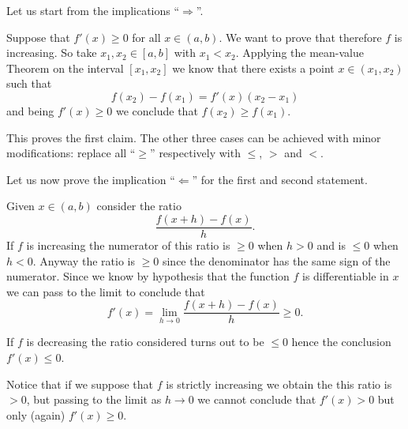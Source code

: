 \documentclass[12pt]{article}
\begin{document}
Let us start from the implications ``$\Rightarrow$''.

Suppose that $f'(x)\ge 0$ for all $x\in (a,b)$. We want to prove that therefore $f$ is increasing. So take $x_1,x_2\in [a,b]$ with $x_1<x_2$. Applying the mean-value Theorem on the interval $[x_1,x_2]$ we know that there exists a point $x\in (x_1,x_2)$ such that
\[
  f(x_2)-f(x_1) = f'(x) (x_2-x_1)
\]
and being $f'(x)\ge 0$ we conclude that $f(x_2)\ge f(x_1)$.

This proves the first claim. The other three cases can be achieved with minor modifications: replace all ``$\ge$'' respectively with $\le$, $>$ and $<$.

Let us now prove the implication ``$\Leftarrow$'' for the first and second statement.

Given $x\in (a,b)$ consider the ratio
\[
  \frac{f(x+h)-f(x)}{h}.
\]
If $f$ is increasing the numerator of this ratio is $\ge 0$ when $h>0$ and is $\le 0$ when $h<0$. Anyway the ratio is $\ge 0$ since the denominator has the same sign of the numerator. Since we know by hypothesis that the function $f$ is differentiable in $x$ we can pass to the limit to conclude that 
\[
f'(x)=\lim_{h\to 0} \frac{f(x+h)-f(x)}{h} \ge 0.
\]

If $f$ is decreasing the ratio considered turns out to be $\le 0$ hence the conclusion $f'(x)\le 0$.

Notice that if we suppose that $f$ is strictly increasing we obtain the this ratio is $>0$, but passing to the limit as $h\to 0$ we cannot conclude that $f'(x)>0$ but only (again) $f'(x)\ge 0$.
\end{document}
